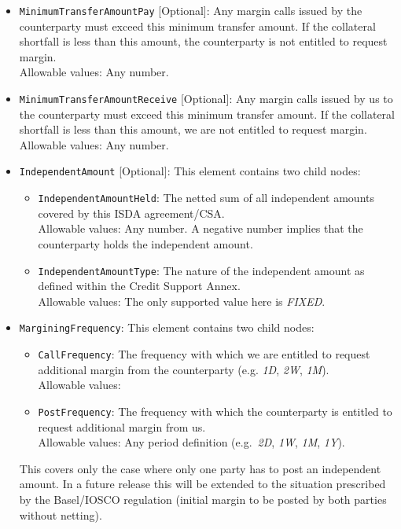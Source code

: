 \begin{itemize}
  \item \lstinline!MinimumTransferAmountPay! [Optional]: Any margin calls issued by the
  counterparty must exceed this minimum transfer amount. If the
  collateral shortfall is less than this amount, the counterparty is not
  entitled to request margin.\\
  Allowable values: Any number.

  \item \lstinline!MinimumTransferAmountReceive! [Optional]: Any margin calls issued by us
  to the counterparty must exceed this minimum transfer amount. If the
  collateral shortfall is less than this amount, we are  not
  entitled to request margin.\\
  Allowable values: Any number.

  \item \lstinline!IndependentAmount! [Optional]: This element contains two child nodes:
    \begin{itemize}
      \item \lstinline!IndependentAmountHeld!: The netted sum of all independent amounts
        covered by this ISDA agreement/CSA. \\
        Allowable values: Any number. A negative number implies that the counterparty
        holds the independent amount.
      \item \lstinline!IndependentAmountType!: The nature of the independent amount as
        defined within the Credit Support Annex. \\
        Allowable values: The only supported value here is \emph{FIXED}.
    \end{itemize}

  \item \lstinline!MarginingFrequency!: This element contains two child nodes:
  \begin{itemize}
    \item \lstinline!CallFrequency!: The frequency with which we are entitled to
      request additional margin from the counterparty (e.g. \emph{1D},
      \emph{2W}, \emph{1M}). \\
      Allowable values: 
    \item \lstinline!PostFrequency!: The frequency with which the counterparty is entitled to
      request additional margin from us. \\
      Allowable values: Any period definition (e.g.\ \emph{2D}, \emph{1W}, \emph{1M},
      \emph{1Y}).
  \end{itemize}
  This covers only the case where only one party has to post an
  independent amount. In a future release this will be extended to the
  situation prescribed by the Basel/IOSCO regulation (initial margin to
  be posted by both parties without netting).


\end{itemize}
